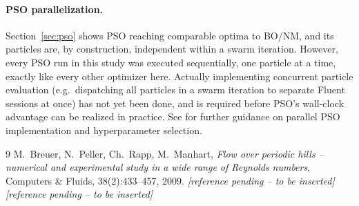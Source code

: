 \paragraph{PSO parallelization.} Section~\ref{sec:pso} shows PSO reaching
comparable optima to BO/NM, and its particles are, by construction, independent
within a swarm iteration. However, every PSO run in this study was executed
sequentially, one particle at a time, exactly like every other optimizer here.
Actually implementing concurrent particle evaluation (e.g.\ dispatching all
particles in a swarm iteration to separate Fluent sessions at once) has not yet
been done, and is required before PSO's wall-clock advantage can be realized in
practice. See \cite{pso_future_work_ref} for further guidance on parallel PSO
implementation and hyperparameter selection.

\begin{thebibliography}{9}
M.\ Breuer, N.\ Peller, Ch.\ Rapp, M.\ Manhart,
\emph{Flow over periodic hills -- numerical and experimental study in a wide
range of Reynolds numbers}, Computers \& Fluids, 38(2):433--457, 2009.
\textit{[reference pending -- to be inserted]}
\textit{[reference pending -- to be inserted]}
\end{thebibliography}


